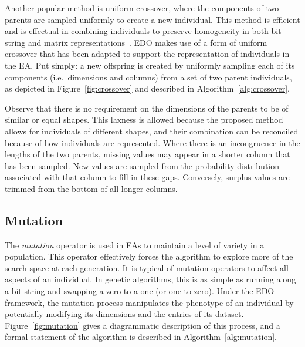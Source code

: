 Another popular method is uniform crossover, where the components of two parents
are sampled uniformly to create a new individual. This method is efficient and
is effectual in combining individuals to preserve homogeneity in both bit string
and matrix representations~\cite{Chen2018,Semenkin2012}. EDO makes use of a form
of uniform crossover that has been adapted to support the representation of
individuals in the EA. Put simply: a new offspring is created by uniformly
sampling each of its components (i.e.\ dimensions and columns) from a set of two
parent individuals, as depicted in Figure~\ref{fig:crossover} and described in
Algorithm~\ref{alg:crossover}.


Observe that there is no requirement on the dimensions of the parents to be of
similar or equal shapes. This laxness is allowed because the proposed method
allows for individuals of different shapes, and their combination can be
reconciled because of how individuals are represented. Where there is an
incongruence in the lengths of the two parents, missing values may appear in a
shorter column that has been sampled. New values are sampled from the
probability distribution associated with that column to fill in these gaps.
Conversely, surplus values are trimmed from the bottom of all longer columns.



\subsection{Mutation}\label{subsection:mutation}

The \emph{mutation} operator is used in EAs to maintain a level of variety in a
population. This operator effectively forces the algorithm to explore more of
the search space at each generation. It is typical of mutation operators to
affect all aspects of an individual. In genetic algorithms, this is as simple as
running along a bit string and swapping a zero to a one (or one to zero). Under
the EDO framework, the mutation process manipulates the phenotype of an
individual by potentially modifying its dimensions and the entries of its
dataset. Figure~\ref{fig:mutation} gives a diagrammatic description of this
process, and a formal statement of the algorithm is described in
Algorithm~\ref{alg:mutation}.

